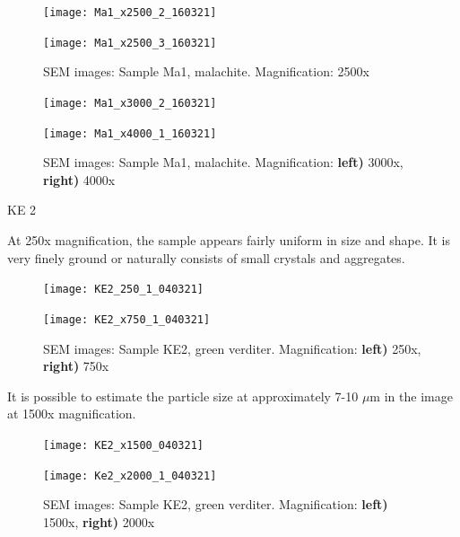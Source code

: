 \begin{figure}[H]
\centering
\begin{minipage}{.45\textwidth}
  \centering
  \texttt{[image: Ma1\_x2500\_2\_160321]}
\end{minipage}
\begin{minipage}{.45\textwidth}
  \centering
  \texttt{[image: Ma1\_x2500\_3\_160321]}
\end{minipage}
\caption[SEM images: Sample Ma1, malachite]{SEM images: Sample Ma1, malachite. Magnification: 2500x}
\label{fig:Ma1_sem_3}
\end{figure}

\begin{figure}[H]
\centering
\begin{minipage}{.45\textwidth}
  \centering
  \texttt{[image: Ma1\_x3000\_2\_160321]}
\end{minipage}
\begin{minipage}{.45\textwidth}
  \centering
  \texttt{[image: Ma1\_x4000\_1\_160321]}
\end{minipage}
\caption[SEM images: Sample Ma1, malachite]{SEM images: Sample Ma1, malachite. Magnification: \textbf{left)} 3000x, \textbf{right)} 4000x}
\label{fig:Ma1_sem_4}
\end{figure}



KE 2

At 250x magnification, the sample appears fairly uniform in size and shape. It is very finely ground or naturally consists of small crystals and aggregates.

\begin{figure}[H]
\centering
\begin{minipage}{.45\textwidth}
  \centering
  \texttt{[image: KE2\_250\_1\_040321]}
\end{minipage}
\begin{minipage}{.45\textwidth}
  \centering
  \texttt{[image: KE2\_x750\_1\_040321]}
\end{minipage}
\caption[SEM images: Sample KE2, green verditer]{SEM images: Sample KE2, green verditer. Magnification: \textbf{left)} 250x, \textbf{right)} 750x}
\label{fig:KE2_sem_1}
\end{figure}

It is possible to estimate the particle size at approximately 7-10 $\mu$m in the image at 1500x magnification.

\begin{figure}[H]
\centering
\begin{minipage}{.45\textwidth}
  \centering
  \texttt{[image: KE2\_x1500\_040321]}
\end{minipage}
\begin{minipage}{.45\textwidth}
  \centering
  \texttt{[image: Ke2\_x2000\_1\_040321]}
\end{minipage}
\caption[SEM images: Sample KE2, green verditer]{SEM images: Sample KE2, green verditer. Magnification: \textbf{left)} 1500x, \textbf{right)} 2000x}
\label{fig:KE2_sem_2}
\end{figure}


